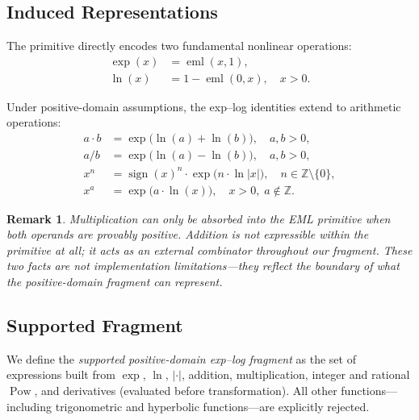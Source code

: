 \documentclass[11pt,a4paper]{article}
\newcommand{\eml}{\operatorname{eml}}
\newcommand{\expf}{\operatorname{exp}}
\newcommand{\lnf}{\operatorname{ln}}
\newcommand{\Abs}[1]{\left|#1\right|}
\newtheorem{remark}{Remark}
\begin{document}
\subsection{Induced Representations}

The primitive directly encodes two fundamental nonlinear operations:
\begin{align}
  \expf(x) &= \eml(x, 1), \label{eq:exp_enc}\\
  \lnf(x)  &= 1 - \eml(0, x), \quad x > 0. \label{eq:log_enc}
\end{align}

Under positive-domain assumptions, the exp--log identities extend to
arithmetic operations:
\begin{align}
  a \cdot b &= \expf\!\bigl(\lnf(a) + \lnf(b)\bigr), \quad a, b > 0, \label{eq:mul}\\
  a / b    &= \expf\!\bigl(\lnf(a) - \lnf(b)\bigr), \quad a, b > 0, \label{eq:div}\\
  x^n      &= \operatorname{sign}(x)^n \cdot
              \expf\!\bigl(n \cdot \lnf\!\Abs{x}\bigr), \quad n \in \mathbb{Z} \setminus \{0\}, \label{eq:intpow}\\
  x^a      &= \expf\!\bigl(a \cdot \lnf(x)\bigr),
              \quad x > 0,\; a \notin \mathbb{Z}. \label{eq:fracpow}
\end{align}

\begin{remark}
  Multiplication can only be absorbed into the EML primitive when both
  operands are provably positive. Addition is not expressible within the
  primitive at all; it acts as an external combinator throughout our
  fragment. These two facts are not implementation limitations---they
  reflect the boundary of what the positive-domain fragment can represent.
\end{remark}

\subsection{Supported Fragment}

We define the \emph{supported positive-domain exp--log fragment} as the
set of expressions built from $\expf$, $\lnf$, $\Abs{\cdot}$, addition,
multiplication, integer and rational $\operatorname{Pow}$, and derivatives
(evaluated before transformation). All other functions---including
trigonometric and hyperbolic functions---are explicitly rejected.

\end{document}
